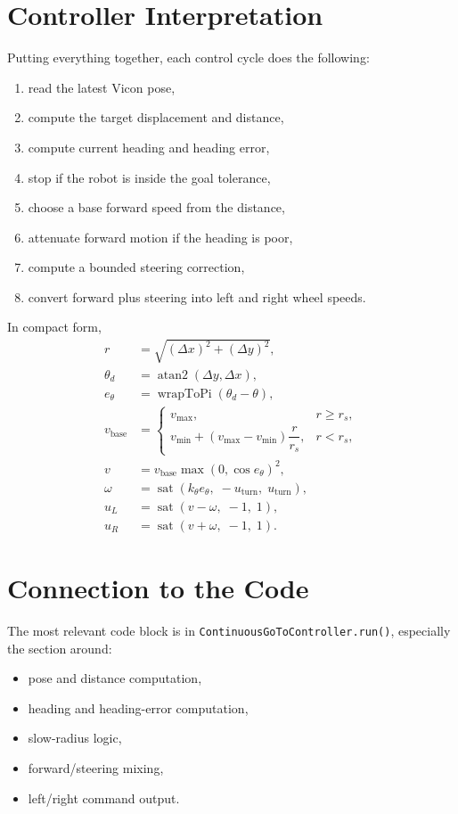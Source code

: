 \documentclass[11pt]{article}
\begin{document}
\section{Controller Interpretation}

Putting everything together, each control cycle does the following:
\begin{enumerate}
\item read the latest Vicon pose,
\item compute the target displacement and distance,
\item compute current heading and heading error,
\item stop if the robot is inside the goal tolerance,
\item choose a base forward speed from the distance,
\item attenuate forward motion if the heading is poor,
\item compute a bounded steering correction,
\item convert forward plus steering into left and right wheel speeds.
\end{enumerate}

In compact form,
\begin{align*}
r &= \sqrt{(\Delta x)^2 + (\Delta y)^2}, \\
\theta_d &= \operatorname{atan2}(\Delta y, \Delta x), \\
e_\theta &= \operatorname{wrapToPi}(\theta_d - \theta), \\
v_{\text{base}} &=
\begin{cases}
v_{\max}, & r \ge r_s, \\
v_{\min} + (v_{\max} - v_{\min}) \dfrac{r}{r_s}, & r < r_s,
\end{cases} \\
v &= v_{\text{base}} \max(0, \cos e_\theta)^2, \\
\omega &= \operatorname{sat}(k_\theta e_\theta,\; -u_{\text{turn}},\; u_{\text{turn}}), \\
u_L &= \operatorname{sat}(v - \omega,\; -1,\; 1), \\
u_R &= \operatorname{sat}(v + \omega,\; -1,\; 1).
\end{align*}

\section{Connection to the Code}

The most relevant code block is in
\texttt{ContinuousGoToController.run()}, especially the section around:
\begin{itemize}
\item pose and distance computation,
\item heading and heading-error computation,
\item slow-radius logic,
\item forward/steering mixing,
\item left/right command output.
\end{itemize}
\end{document}
